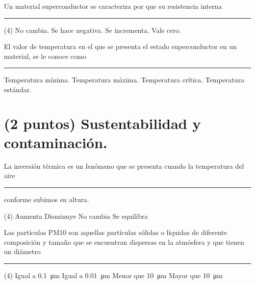 \documentclass[12pt, letter]{exam}
\begin{document}
\begin{questions}
    \question Un material superconductor se caracteriza por que su resistencia interna \rule{2cm}{0.1mm}
    \begin{tasks}(4)
        \task No cambia.
        \task Se hace negativa.
        \task Se incrementa.
        \task Vale cero.
    \end{tasks}
    \question El valor de temperatura en el que se presenta el estado superconductor en un material, se le conoce como \rule{2cm}{0.1mm}
    \begin{multicols}{2}
    \begin{tasks}
        \task Temperatura mínima.
        \task Temperatura máxima.
        \task Temperatura crítica.
        \task Temperatura estándar.
    \end{tasks}
    \end{multicols}

    \section{(2 puntos) Sustentabilidad y contaminación.}

    \question La inversión térmica es un fenómeno que se presenta cuando la temperatura del aire \rule{2cm}{0.1mm} conforme subimos en altura.
    \begin{tasks}(4)
        \task Aumenta
        \task Disminuye
        \task No cambia
        \task Se equilibra
    \end{tasks}
    \question Las partículas PM10 son aquellas partículas sólidas o líquidas de diferente composición y tamaño que se encuentran dispersas en la atmósfera y que tienen un diámetro \rule{2cm}{0.1mm}
    \begin{tasks}(4)
        \task Igual a \SI{0.1}{\micro\meter}
        \task Igual a \SI{0.01}{\micro\meter}
        \task Menor que \SI{10}{\micro\meter}
        \task Mayor que \SI{10}{\micro\meter}
    \end{tasks}

\end{questions}

    \newpage
\end{document}
